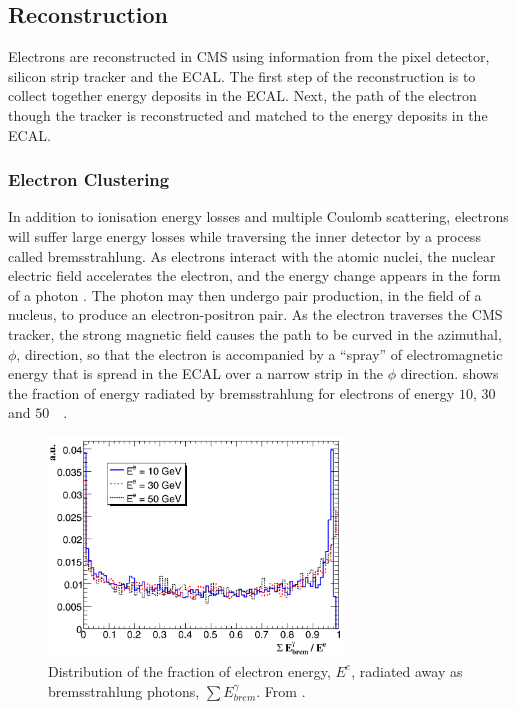 \subsection{Reconstruction}
Electrons are reconstructed in CMS using information from the pixel detector,
silicon strip tracker and the ECAL.  The first step of the reconstruction is to
collect together energy deposits in the ECAL. Next, the path of the electron
though the tracker is reconstructed and matched to the energy deposits in the
ECAL\cite{baffioni2007electron,adam2009electron}.

\subsubsection{Electron Clustering}

In addition to ionisation energy losses and multiple Coulomb scattering,
electrons will suffer large energy losses while traversing the inner detector by
a process called bremsstrahlung.  As electrons interact with the atomic nuclei,
the nuclear electric field accelerates the electron, and the energy change
appears in the form of a photon \cite{perkins2000introduction}.  The photon may
then undergo pair production, in the field of a nucleus, to produce an
electron-positron pair.  As the electron traverses the CMS tracker, the strong
magnetic field causes the path to be curved in the azimuthal, $\phi$, direction,
so that the electron is accompanied by a ``spray'' of electromagnetic energy
that is spread in the ECAL over a narrow strip in the $\phi$ direction. 
 shows the fraction of energy radiated by bremsstrahlung for
electrons of energy $10$, $30$ and \unit{$50$}{\GeV}
\cite{baffioni2007electron}.

\begin{figure}[htbp]
  \centering
  \includegraphics[width=0.7\textwidth]{brem}
  \caption[Distribution of the fraction of electron energy radiated away as
bremsstrahlung photons.] {Distribution of the fraction of electron energy,
$E^{e}$, radiated away as bremsstrahlung photons, $\sum E_{brem}^{\gamma}$. From
\cite{baffioni2007electron}.}
\label{fig:brem}
\end{figure}

